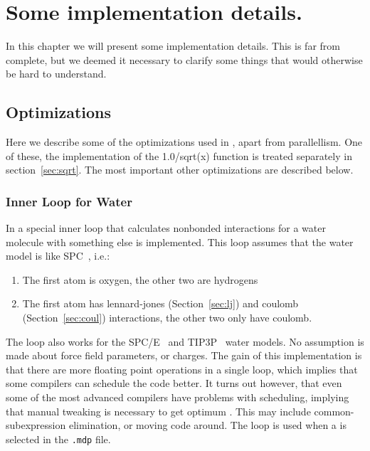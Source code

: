 \chapter{Some implementation details.}
In this chapter we will present some implementation details. This is
far from complete, but we deemed it necessary to clarify some things
that would otherwise be hard to understand.


\section{Optimizations}
Here we describe some of the optimizations used in {\gromacs}, apart
from parallellism. One of these, the implementation of the 
1.0/sqrt(x) function is treated separately in section~\ref{sec:sqrt}.
The most important other optimizations are described below.

\subsection{Inner Loop for Water}
In {\gromacs} a special inner loop that calculates nonbonded
interactions for a water molecule with something else is 
implemented. This loop assumes that the water model is like
SPC~\cite{Berendsen81}, i.e.:
\begin{enumerate}
\item	The first atom is oxygen, the other two are hydrogens
\item	The first atom has lennard-jones (Section~\ref{sec:lj}) and 
	coulomb (Section~\ref{sec:coul}) interactions, the other
	two only have coulomb.
\end{enumerate}

The loop also works for the SPC/E~\cite{Berendsen87} and 
TIP3P~\cite{Jorgensen83} water models. No assumption is made about
force field parameters, or charges.
The gain of this implementation is that there are more floating point
operations in a single loop, which implies that some compilers
can schedule the code better. It turns out however, that even
some of the most advanced compilers have problems with scheduling, 
implying that manual tweaking is necessary to get optimum 
.
This may include common-subexpression elimination, or moving
code around. 
The loop is used when a  is selected in the 
{\tt .mdp} file.

